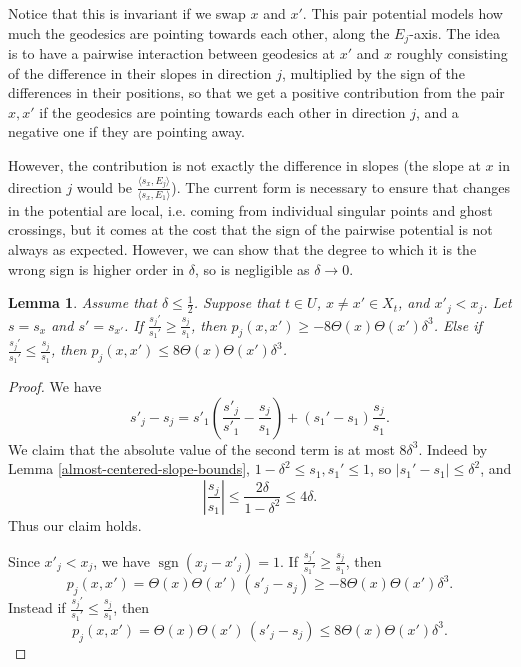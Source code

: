 \documentclass[11pt,reqno,twoside]{amsart}
\DeclareMathOperator{\sign}{\mathrm{sgn}}
\newtheorem{lemma}{Lemma}
\theoremstyle{definition}
\begin{document}
Notice that this is invariant if we swap $x$ and $x'$.  This pair potential models how much the geodesics are pointing towards each other, along the $E_j$-axis. The idea is to have a pairwise interaction between geodesics at $x'$ and $x$ roughly consisting of the difference in their slopes in direction $j$, multiplied by the sign of the differences in their positions, so that we get a positive contribution from the pair $x,x'$ if the geodesics are pointing towards each other in direction $j$, and a negative one if they are pointing away. 

However, the contribution is not exactly the difference in slopes (the slope at $x$ in direction $j$ would be $\frac{\langle s_x, E_j\rangle}{\langle s_x,E_1\rangle}$). The current form is necessary to ensure that changes in the potential are local, i.e. coming from individual singular points and ghost crossings, but it comes at the cost that the sign of the pairwise potential is not always as expected. However, we can show that the degree to which it is the wrong sign is higher order in $\delta$, so is negligible as $\delta \to 0$.

\begin{lemma} \label{pair-potential-sign}
Assume that $\delta \leq \frac{1}{2}$.
    Suppose that $t \in U$, $x \neq x' \in X_t$, and $x'_j < x_j$. Let $s = s_x$ and $s' = s_{x'}$. If $\frac{s_j'}{s_1'} \geq \frac{s_j}{s_1}$, then 
    $p_j(x,x') \geq -8\Theta(x)\Theta(x')\delta^3$. Else if $\frac{s_j'}{s_1'} \leq \frac{s_j}{s_1}$, then $p_j(x,x') \leq 8\Theta(x)\Theta(x')\delta^3$.
    
\end{lemma}
\begin{proof}
    
        We have
        \[s'_j - s_j = s'_1\left(\frac{s'_j}{s'_1} - \frac{s_j}{s_1}\right) + (s_1'-s_1) \frac{s_j}{s_1}.\]
         We claim that the absolute value of the second term is at most $8\delta^3$. Indeed by Lemma \ref{almost-centered-slope-bounds}, $1-\delta^2 \leq s_1,s_1' \leq 1$, so $|s_1'-s_1| \leq \delta^2$, and
        \[\left|\frac{s_j}{s_1}\right| \leq \frac{2\delta}{1-\delta^2} \leq 4\delta.\] Thus our claim holds. 

        Since $x'_j < x_j$, we have $\sign(x_j-x'_j)=1.$
        If $\frac{s_j'}{s_1'} \geq \frac{s_j}{s_1}$, then
        \[p_j(x,x') = \Theta(x) \Theta(x') \, (s'_j-s_j) \geq -8 \Theta(x)\Theta(x')\delta^3. \]
        Instead if $\frac{s_j'}{s_1'} \leq \frac{s_j}{s_1}$, then
         \[p_j(x,x') = \Theta(x) \Theta(x') \, (s'_j-s_j) \leq 8 \Theta(x) \Theta(x') \delta^3. \]
\end{proof}
\end{document}
